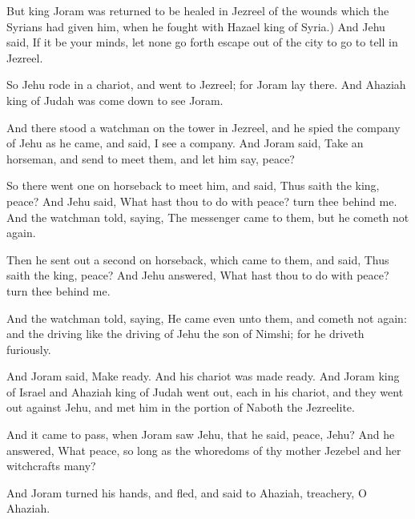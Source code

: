 {But
king
Joram was
returned to be
healed in
Jezreel of the
wounds which the
Syrians had
given him, when he
fought with
Hazael
king of
Syria.) And
Jehu
said, If it
be your
minds,
{} let
none go
forth
{}
escape out of the
city to
go to
tell
{} in
Jezreel.


\par }{\PP {}So
Jehu rode in a
chariot, and
went to
Jezreel; for
Joram
lay there. And
Ahaziah
king of
Judah was come
down to
see
Joram.

And there
stood a
watchman on the
tower in
Jezreel, and he
spied the
company of
Jehu as he
came, and
said, I
see a
company. And
Joram
said,
Take an
horseman, and
send to
meet them, and let him
say,
{}
peace?

So there
went one on
horseback to
meet him, and
said, Thus
saith the
king,
{}
peace? And
Jehu
said, What hast thou to do with
peace?
turn thee
behind me. And the
watchman
told,
saying, The
messenger
came to them, but he cometh not
again.

Then he sent
out a
second on
horseback, which
came to them, and
said, Thus
saith the
king,
{}
peace? And
Jehu
answered, What hast thou to do with
peace?
turn thee
behind me.

And the
watchman
told,
saying, He
came even unto them, and cometh not
again: and the
driving
{} like the
driving of
Jehu the
son of
Nimshi; for he
driveth
furiously.

And
Joram
said, Make
ready. And his
chariot was made
ready. And
Joram
king of
Israel and
Ahaziah
king of
Judah went
out,
each in his
chariot, and they went
out
against
Jehu, and
met him in the
portion of
Naboth the
Jezreelite.

And it came to pass, when
Joram
saw
Jehu, that he
said,
{}
peace,
Jehu? And he
answered, What
peace, so long
as the
whoredoms of thy
mother
Jezebel and her
witchcrafts
{}
many?

And
Joram
turned his
hands, and
fled, and
said to
Ahaziah,
{}
treachery, O
Ahaziah.

}
